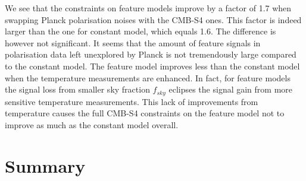 
We see that the constraints on feature models improve by a factor of 1.7 when swapping Planck polarisation noises with the CMB-S4 ones. This factor is indeed larger than the one for constant model, which equals 1.6. The difference is however not significant. It seems that the amount of feature signals in polarisation data left unexplored by Planck is not tremendously large compared to the constant model. The feature model improves less than the constant model when the temperature measurements are enhanced. In fact, for feature models the signal loss from smaller sky fraction $f_{sky}$ eclipses the signal gain from more sensitive temperature measurements. This lack of improvements from temperature causes the full CMB-S4 constraints on the feature model not to improve as much as the constant model overall.


\section*{Summary} 

